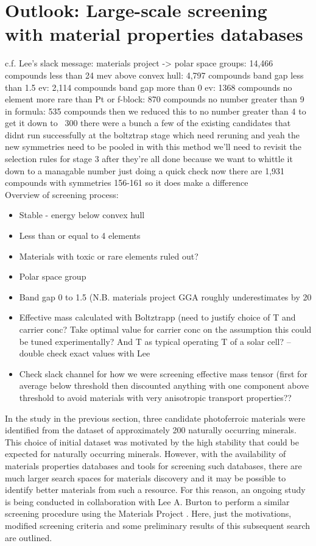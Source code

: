 \documentclass[11pt, twoside]{report}
\begin{document}
\section{Outlook: Large-scale screening with material properties databases}

c.f. Lee's slack message:
materials project ->
polar space groups: 14,466 compounds
 less than 24 mev above convex hull: 4,797 compounds
   band gap less than 1.5 ev: 2,114 compounds
     band gap more than 0 ev: 1368 compounds
       no element more rare than Pt or f-block: 870 compounds
         no number greater than 9 in formula: 535 compounds
then we reduced this to no number greater than 4 to get it down to ~300
there were a bunch a few of the existing candidates that didnt run successfully at the boltztrap stage which need reruning and yeah the new symmetries need to be pooled in with this method
we’ll need to revisit the selection rules for stage 3 after they’re all done
because we want to whittle it down to a managable number
just doing a quick check now there are 1,931 compounds with symmetries 156-161 so it does make a difference\\

Overview of screening process:
\begin{itemize}
\item Stable - energy below convex hull
\item Less than or equal to 4 elements
\item Materials with toxic or rare elements ruled out?
\item Polar space group
\item Band gap 0 to 1.5 (N.B. materials project GGA roughly underestimates by 20%
\item Effective mass calculated with Boltztrapp (need to justify choice of T and carrier conc? Take optimal value for carrier conc on the assumption this could be tuned experimentally? And T as typical operating T of a solar cell? – double check exact values with Lee
\item Check slack channel for how we were screening effective mass tensor (first for average below threshold then discounted anything with one component above threshold to avoid materials with very anisotropic transport properties??
\end{itemize}


In the study in the previous section, three candidate photoferroic materials were identified from the dataset of approximately 200 naturally occurring minerals. This choice of initial dataset was motivated by the high stability that could be expected for naturally occurring minerals. However, with the availability of materials properties databases and tools for screening such databases, there are much larger search spaces for materials discovery and it may be possible to identify better materials from such a resource. For this reason, an ongoing study is being conducted in collaboration with Lee A. Burton to perform a similar screening procedure using the Materials Project \cite{materials_project}. Here, just the motivations, modified screening criteria and some preliminary results of this subsequent search are outlined.
\end{document}
